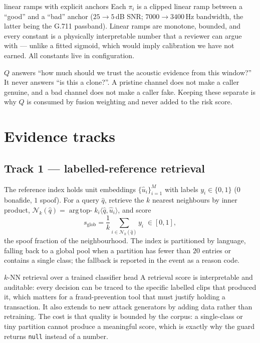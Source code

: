 \documentclass[11pt,a4paper]{article}
\newcommand{\code}[1]{\texttt{\small #1}}
\newcommand{\unitvec}[1]{\widehat{#1}}
\begin{document}
\begin{whybox}{linear ramps with explicit anchors}
Each $\pi_i$ is a clipped linear ramp between a ``good'' and a ``bad'' anchor
($25 \to 5$\,dB SNR; $7000 \to 3400$\,Hz bandwidth, the latter being the G.711
passband). Linear ramps are monotone, bounded, and every constant is a physically
interpretable number that a reviewer can argue with --- unlike a fitted sigmoid, which
would imply calibration we have not earned. All constants live in configuration.
\end{whybox}

\begin{tcolorbox}[colback=strivegrey,colframe=strivenavy,title=\textbf{$Q$ is reliability, not risk}]
$Q$ answers ``how much should we trust the acoustic evidence from this window?'' It
never answers ``is this a clone?''. A pristine channel does not make a caller genuine,
and a bad channel does not make a caller fake. Keeping these separate is why $Q$ is
consumed by fusion weighting and never added to the risk score.
\end{tcolorbox}

\section{Evidence tracks}

\subsection{Track 1 --- labelled-reference retrieval}

The reference index holds unit embeddings $\{\unitvec{u}_i\}_{i=1}^{M}$ with labels
$y_i \in \{0,1\}$ ($0$ bonafide, $1$ spoof). For a query $\unitvec{q}$, retrieve the $k$
nearest neighbours by inner product,
$\mathcal{N}_k(\unitvec{q}) = \operatorname{arg\,top-}k_i \langle \unitvec{q},\unitvec{u}_i\rangle$, and score
\begin{equation}
s_{\mathrm{glob}} = \frac{1}{k}\sum_{i \in \mathcal{N}_k(\unitvec{q})} y_i \;\in [0,1],
\end{equation}
the spoof fraction of the neighbourhood. The index is partitioned by language, falling
back to a global pool when a partition has fewer than $20$ entries or contains a single
class; the fallback is reported in the event as a reason code.

\begin{whybox}{$k$-NN retrieval over a trained classifier head}
A retrieval score is interpretable and auditable: every decision can be traced to the
specific labelled clips that produced it, which matters for a fraud-prevention tool
that must justify holding a transaction. It also extends to new attack generators by
adding data rather than retraining. The cost is that quality is bounded by the corpus:
a single-class or tiny partition cannot produce a meaningful score, which is exactly
why the guard returns \code{null} instead of a number.
\end{whybox}
\end{document}
